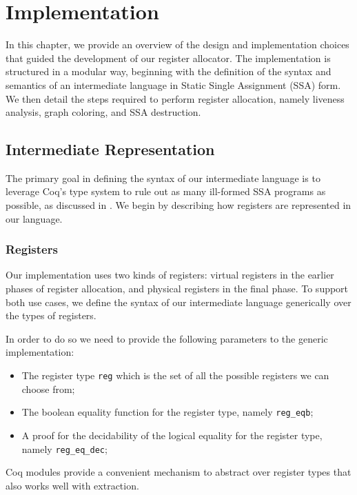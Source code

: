 
\chapter{Implementation}
\label{cha:implementation}

In this chapter, we provide an overview of the design and implementation choices that guided the development of our register allocator. The implementation is structured in a modular way, beginning with the definition of the syntax and semantics of an intermediate language in Static Single Assignment (SSA) form. We then detail the steps required to perform register allocation, namely liveness analysis, graph coloring, and SSA destruction.

\section{Intermediate Representation}
\label{sec:ir}

The primary goal in defining the syntax of our intermediate language is to leverage Coq’s type system to rule out as many ill-formed SSA programs as possible, as discussed in . We begin by describing how registers are represented in our language.

\subsection{Registers}

Our implementation uses two kinds of registers: virtual registers in the earlier phases of register allocation, and physical registers in the final phase. To support both use cases, we define the syntax of our intermediate language generically over the types of registers.

In order to do so we need to provide the following parameters to the generic implementation:
\begin{itemize}
    \item The register type \texttt{reg} which is the set of all the possible registers we can choose from;
    \item The boolean equality function for the register type, namely \texttt{reg\_eqb};
    \item A proof for the decidability of the logical equality for the register type, namely \texttt{reg\_eq\_dec};
\end{itemize}

Coq modules provide a convenient mechanism to abstract over register types that also works well with extraction.

